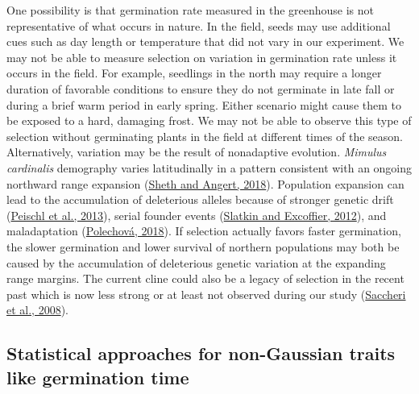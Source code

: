 \documentclass[
  12pt,
]{article}
\begin{document}
One possibility is that germination rate measured in the greenhouse is not representative of what occurs in nature. In the field, seeds may use additional cues such as day length or temperature that did not vary in our experiment. We may not be able to measure selection on variation in germination rate unless it occurs in the field. For example, seedlings in the north may require a longer duration of favorable conditions to ensure they do not germinate in late fall or during a brief warm period in early spring. Either scenario might cause them to be exposed to a hard, damaging frost. We may not be able to observe this type of selection without germinating plants in the field at different times of the season. Alternatively, variation may be the result of nonadaptive evolution. \emph{Mimulus cardinalis} demography varies latitudinally in a pattern consistent with an ongoing northward range expansion (\protect\hyperlink{ref-sheth_demographic_2018}{Sheth and Angert, 2018}). Population expansion can lead to the accumulation of deleterious alleles because of stronger genetic drift (\protect\hyperlink{ref-peischl_accumulation_2013}{Peischl et al., 2013}), serial founder events (\protect\hyperlink{ref-slatkin_serial_2012}{Slatkin and Excoffier, 2012}), and maladaptation (\protect\hyperlink{ref-polechova_is_2018}{Polechová, 2018}). If selection actually favors faster germination, the slower germination and lower survival of northern populations may both be caused by the accumulation of deleterious genetic variation at the expanding range margins. The current cline could also be a legacy of selection in the recent past which is now less strong or at least not observed during our study (\protect\hyperlink{ref-saccheri_selection_2008}{Saccheri et al., 2008}).

\hypertarget{statistical-approaches-for-non-gaussian-traits-like-germination-time}{%
\subsection{Statistical approaches for non-Gaussian traits like germination time}\label{statistical-approaches-for-non-gaussian-traits-like-germination-time}}
\end{document}
